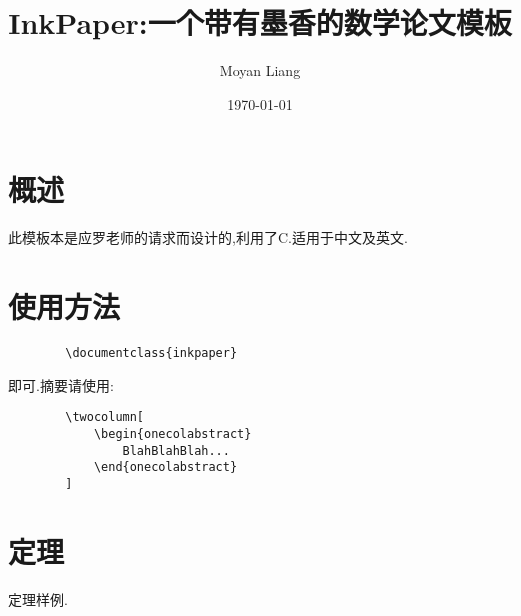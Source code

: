 \documentclass[cn]{inkpaper}
\title{InkPaper:一个带有墨香的数学论文模板}
\author{Moyan Liang}
\date{\today}
\begin{document}
    \maketitle
    \section{概述}
    此模板本是应罗老师的请求而设计的,利用了C.适用于中文及英文.
    \section{使用方法}
    \begin{lstlisting}
        \documentclass{inkpaper}
    \end{lstlisting}
    即可.摘要请使用:
    \begin{lstlisting}
        \twocolumn[
            \begin{onecolabstract}
                BlahBlahBlah...
            \end{onecolabstract}
        ]
    \end{lstlisting}
    \section{定理}
    \begin{theorem}
        定理样例.
    \end{theorem}
\end{document}

